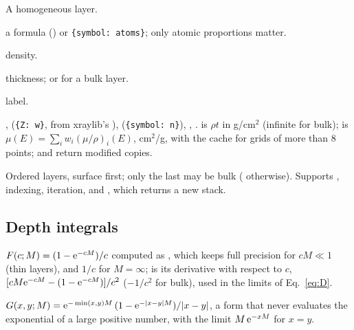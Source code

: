 A homogeneous layer.
\begin{args}
\item[composition] a formula () or \texttt{\{symbol: atoms\}}; only atomic
  proportions matter.
\item[density\_g\_cm3] density.
\item[thickness\_um] thickness;  or  for a bulk layer.
\item[name] label.
\end{args}
 ,  (\texttt{\{Z: w\}}, from xraylib's
),  (\texttt{\{symbol: n\}}), ,
.  is $\rho t$ in g/cm$^2$ (infinite for bulk);
 is $\mu(E) = \sum_i w_i(\mu/\rho)_i(E)$, cm$^2$/g, with the cache for grids of
more than 8 points;  and  return modified copies.

Ordered layers, surface first; only the last may be bulk ( otherwise). Supports
, indexing, iteration, and , which returns a new stack.

\subsection{Depth integrals}

$F(c;M) = (1-\mathrm{e}^{-cM})/c$ computed as , which keeps full precision for
$cM \ll 1$ (thin layers), and $1/c$ for $M=\infty$;  is its derivative with respect
to $c$, $[cM\mathrm{e}^{-cM}-(1-\mathrm{e}^{-cM})]/c^2$ ($-1/c^2$ for bulk), used in the limits of
Eq.~\eqref{eq:D}.

$G(x,y;M) = \mathrm{e}^{-\min(x,y)M}\,(1-\mathrm{e}^{-|x-y|M})/|x-y|$, a form that never evaluates the
exponential of a large positive number, with the limit $M\,\mathrm{e}^{-xM}$ for $x=y$.

